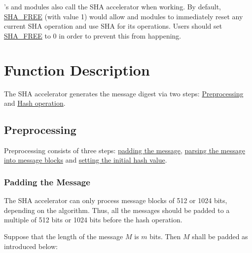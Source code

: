 \documentclass[main\_\_EN.tex]{subfiles}
\begin{document}
\begin{importantlisting}
\vspace{-0.5em}

    \chipname{}'s  and  modules also call the SHA accelerator when working. By default, \hyperref[fielddesc:SHAFREE]{SHA\_FREE} (with value 1) would allow  and  modules to immediately reset any current SHA operation and use SHA for its operations. Users should set \hyperref[fielddesc:SHAFREE]{SHA\_FREE} to 0 in order to prevent this from happening.
\end{importantlisting}

\section{Function Description}

The SHA accelerator generates the message digest via two steps: \hyperref[sec:sha-preprocessing]{Preprocessing} and  \hyperref[sec:sha-hash-operation]{Hash operation}.

\subsection{Preprocessing}\label{sec:sha-preprocessing}

Preprocessing consists of three steps: \hyperref[sec:sha-text-padding]{padding the message}, \hyperref[sec:sha-parsing-message]{parsing the message into message blocks} and \hyperref[sec:sha-initial-hash]{setting the initial hash value}.

\subsubsection{Padding the Message}\label{sec:sha-text-padding}

The SHA accelerator can only process message blocks of 512 or 1024 bits, depending on the algorithm. Thus, all the messages should be padded to a multiple of 512 bits or 1024 bits before the hash operation.

Suppose that the length of the message \begin{math}M\end{math} is \begin{math} m \end{math} bits. Then \begin{math} M \end{math} shall be padded as introduced below:
\end{document}
